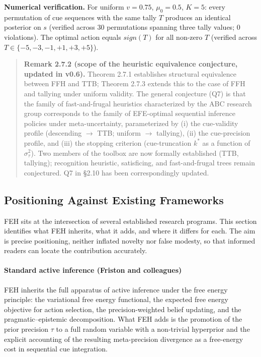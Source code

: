 \documentclass{article}
\begin{document}
\textbf{Numerical verification.} For uniform \(v = 0.75\),
\(\mu_{0} = 0.5\), \(K = 5\): every permutation of cue sequences with
the same tally \(T\) produces an identical posterior on \(s\) (verified
across 30 permutations spanning three tally values; 0 violations). The
optimal action equals \(sign(T)\) for all non-zero \(T\) (verified
across \(T \in \{ - 5, - 3, - 1, + 1, + 3, + 5\}\)).

\begin{quote}
\textbf{Remark 2.7.2 (scope of the heuristic equivalence conjecture,
updated in v0.6).} Theorem 2.7.1 establishes structural equivalence
between FFH and TTB; Theorem 2.7.3 extends this to the case of FFH and
tallying under uniform validity. The general conjecture (Q7) is that the
family of fast-and-frugal heuristics characterized by the ABC research
group corresponds to the family of EFE-optimal sequential inference
policies under meta-uncertainty, parameterized by (i) the cue-validity
profile (descending \ensuremath{\rightarrow} TTB; uniform \ensuremath{\rightarrow} tallying), (ii) the cue-precision
profile, and (iii) the stopping criterion (cue-truncation \(k^{*}\) as a
function of \(\sigma_{\tau}^{2}\)). Two members of the toolbox are now
formally established (TTB, tallying); recognition heuristic,
satisficing, and fast-and-frugal trees remain conjectured. Q7 in \S{}2.10
has been correspondingly updated.
\end{quote}

\subsection{Positioning Against Existing
Frameworks}\label{positioning-against-existing-frameworks}

FEH sits at the intersection of several established research programs.
This section identifies what FEH inherits, what it adds, and where it
differs for each. The aim is precise positioning, neither inflated
novelty nor false modesty, so that informed readers can locate the
contribution accurately.

\paragraph{Standard active inference (Friston and
colleagues)}\label{standard-active-inference-friston-and-colleagues}

FEH inherits the full apparatus of active inference under the free
energy principle: the variational free energy functional, the expected
free energy objective for action selection, the precision-weighted
belief updating, and the pragmatic--epistemic decomposition. What FEH
adds is the promotion of the prior precision \ensuremath{\tau} to a full random variable
with a non-trivial hyperprior and the explicit accounting of the
resulting meta-precision divergence as a free-energy cost in sequential
cue integration.
\end{document}
